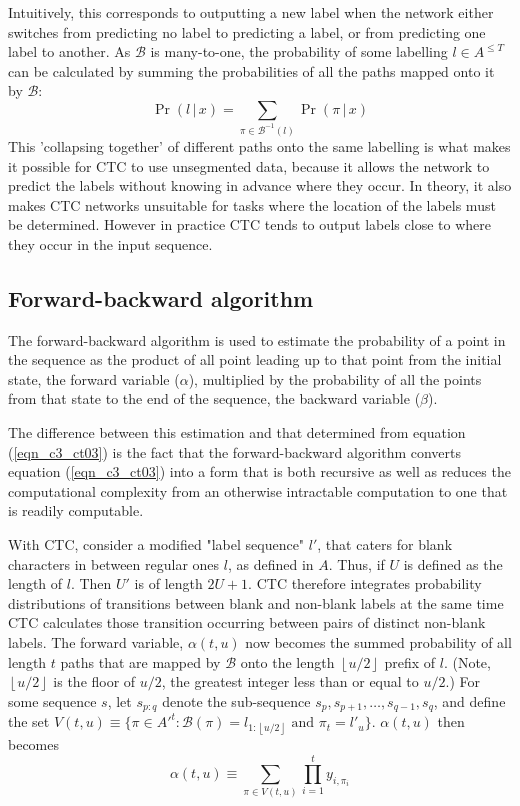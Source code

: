 Intuitively, this corresponds to outputting a new label when the network either switches from predicting no label to predicting a label, or from predicting one label to another. As $\mathcal{B}$ is many-to-one, the probability of some labelling $l \in A^{\le T}$ can be calculated by summing the probabilities of all the paths mapped onto it by $\mathcal{B}$:
\begin{equation}
\Pr( l \, | \, x) = \sum_{\pi \in \mathcal{B}^{-1}(l)} \Pr( \pi \, | \, x)
\label{eqn_c3_ct03}\end{equation}
This 'collapsing together' of different paths onto the same labelling is what makes it possible for CTC to use unsegmented data, because it allows the network to predict the labels without knowing in advance where they occur. In theory, it also makes CTC networks unsuitable for tasks where the location of the labels must be determined. However in practice CTC tends to output labels close to where they occur in the input sequence.

\subsection{Forward-backward algorithm}

The forward-backward algorithm is used to estimate the probability of a point in the sequence as the product of all point leading up to that point from the  initial state, the forward variable ($\alpha$), multiplied by the probability of all the points from that state to the end of the sequence, the backward variable ($\beta$).

The difference between this estimation and that determined from equation (\ref{eqn_c3_ct03}) is the fact that the forward-backward algorithm converts equation (\ref{eqn_c3_ct03}) into a form that is both recursive as well as reduces the computational complexity from an otherwise intractable computation to one that is readily computable.

With CTC, consider a modified "label sequence" $l'$, that caters for blank characters in between regular ones $l$, as defined in $A$. Thus, if $U$ is defined as the length of $l$.  Then $U'$ is of length $2U + 1$. CTC therefore integrates probability distributions of transitions between blank and non-blank labels at the same time CTC calculates those transition occurring between pairs of distinct non-blank labels.  The forward variable, $\alpha(t,u)$ now becomes the summed probability of all length $t$ paths that are mapped by $\mathcal{B}$ onto the length $\left \lfloor{u/2}\right \rfloor$ prefix of $l$. (Note, $\left \lfloor{u/2}\right \rfloor$ is the floor of $u/2$, the greatest integer less than or equal to $u/2$.) For some sequence $s$, let $s_{p:q}$ denote the sub-sequence $s_p, s_{p+1},\dots,s_{q-1},s_q$, and define the set $V(t,u) \equiv \{ \pi \in A'^t : \mathcal{B}(\pi) = l_{1:\left \lfloor{u/2}\right \rfloor} \text{ and } \pi_t = l'_u \}$.  $\alpha(t,u)$ then becomes
\begin{equation}
\alpha(t,u) \equiv \sum_{\pi \in V(t,u)} \prod_{i=1}^{t} y_{i,\pi_i} 
\label{eqn_c3_ctc04}
\end{equation}

